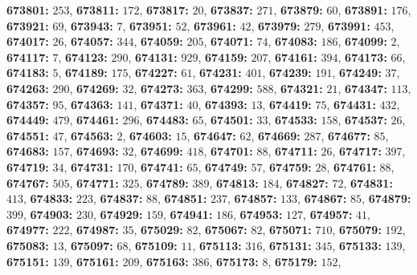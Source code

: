 \textsf{\bfseries 673801:} $253$, \textsf{\bfseries 673811:} $172$, \textsf{\bfseries 673817:} $20$, \textsf{\bfseries 673837:} $271$, \textsf{\bfseries 673879:} $60$, \textsf{\bfseries 673891:} $176$, \textsf{\bfseries 673921:} $69$, \textsf{\bfseries 673943:} $7$, \textsf{\bfseries 673951:} $52$, \textsf{\bfseries 673961:} $42$, \textsf{\bfseries 673979:} $279$, \textsf{\bfseries 673991:} $453$, \textsf{\bfseries 674017:} $26$, \textsf{\bfseries 674057:} $344$, \textsf{\bfseries 674059:} $205$, \textsf{\bfseries 674071:} $74$, \textsf{\bfseries 674083:} $186$, \textsf{\bfseries 674099:} $2$, \textsf{\bfseries 674117:} $7$, \textsf{\bfseries 674123:} $290$, \textsf{\bfseries 674131:} $929$, \textsf{\bfseries 674159:} $207$, \textsf{\bfseries 674161:} $394$, \textsf{\bfseries 674173:} $66$, \textsf{\bfseries 674183:} $5$, \textsf{\bfseries 674189:} $175$, \textsf{\bfseries 674227:} $61$, \textsf{\bfseries 674231:} $401$, \textsf{\bfseries 674239:} $191$, \textsf{\bfseries 674249:} $37$, \textsf{\bfseries 674263:} $290$, \textsf{\bfseries 674269:} $32$, \textsf{\bfseries 674273:} $363$, \textsf{\bfseries 674299:} $588$, \textsf{\bfseries 674321:} $21$, \textsf{\bfseries 674347:} $113$, \textsf{\bfseries 674357:} $95$, \textsf{\bfseries 674363:} $141$, \textsf{\bfseries 674371:} $40$, \textsf{\bfseries 674393:} $13$, \textsf{\bfseries 674419:} $75$, \textsf{\bfseries 674431:} $432$, \textsf{\bfseries 674449:} $479$, \textsf{\bfseries 674461:} $296$, \textsf{\bfseries 674483:} $65$, \textsf{\bfseries 674501:} $33$, \textsf{\bfseries 674533:} $158$, \textsf{\bfseries 674537:} $26$, \textsf{\bfseries 674551:} $47$, \textsf{\bfseries 674563:} $2$, \textsf{\bfseries 674603:} $15$, \textsf{\bfseries 674647:} $62$, \textsf{\bfseries 674669:} $287$, \textsf{\bfseries 674677:} $85$, \textsf{\bfseries 674683:} $157$, \textsf{\bfseries 674693:} $32$, \textsf{\bfseries 674699:} $418$, \textsf{\bfseries 674701:} $88$, \textsf{\bfseries 674711:} $26$, \textsf{\bfseries 674717:} $397$, \textsf{\bfseries 674719:} $34$, \textsf{\bfseries 674731:} $170$, \textsf{\bfseries 674741:} $65$, \textsf{\bfseries 674749:} $57$, \textsf{\bfseries 674759:} $28$, \textsf{\bfseries 674761:} $88$, \textsf{\bfseries 674767:} $505$, \textsf{\bfseries 674771:} $325$, \textsf{\bfseries 674789:} $389$, \textsf{\bfseries 674813:} $184$, \textsf{\bfseries 674827:} $72$, \textsf{\bfseries 674831:} $413$, \textsf{\bfseries 674833:} $223$, \textsf{\bfseries 674837:} $88$, \textsf{\bfseries 674851:} $237$, \textsf{\bfseries 674857:} $133$, \textsf{\bfseries 674867:} $85$, \textsf{\bfseries 674879:} $399$, \textsf{\bfseries 674903:} $230$, \textsf{\bfseries 674929:} $159$, \textsf{\bfseries 674941:} $186$, \textsf{\bfseries 674953:} $127$, \textsf{\bfseries 674957:} $41$, \textsf{\bfseries 674977:} $222$, \textsf{\bfseries 674987:} $35$, \textsf{\bfseries 675029:} $82$, \textsf{\bfseries 675067:} $82$, \textsf{\bfseries 675071:} $710$, \textsf{\bfseries 675079:} $192$, \textsf{\bfseries 675083:} $13$, \textsf{\bfseries 675097:} $68$, \textsf{\bfseries 675109:} $11$, \textsf{\bfseries 675113:} $316$, \textsf{\bfseries 675131:} $345$, \textsf{\bfseries 675133:} $139$, \textsf{\bfseries 675151:} $139$, \textsf{\bfseries 675161:} $209$, \textsf{\bfseries 675163:} $386$, \textsf{\bfseries 675173:} $8$, \textsf{\bfseries 675179:} $152$, 
